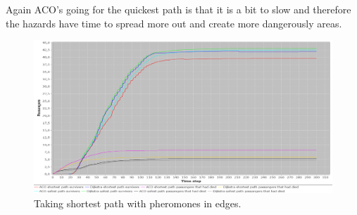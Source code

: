 Again ACO's going for the quickest path is that it is a bit to slow and therefore the hazards have time to spread more out and create more dangerously areas.

\begin{figure} [h]
\centering
\hspace*{-1.0in}
\includegraphics[scale=0.35]{images/Graph-using-200-rounds-50-passangers.png}
\caption{Taking shortest path with pheromones in edges.}
\label{fig:celeb50}
\end{figure}